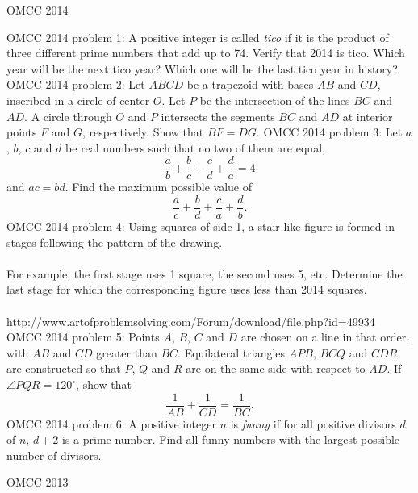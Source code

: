 OMCC 2014 

OMCC 2014 problem 1:  A positive integer is called \textit{tico} if it is the product of three different prime numbers that add up to 74. Verify that 2014 is tico. Which year will be the next tico year? Which one will be the last tico year in history? 
OMCC 2014 problem 2:  Let $ABCD$ be a trapezoid with bases $AB$ and $CD$, inscribed in a circle of center $O$. Let $P$ be the intersection of the lines $BC$ and $AD$. A circle through $O$ and $P$ intersects the segments $BC$ and $AD$ at interior points $F$ and $G$, respectively. Show that $BF=DG$. 
OMCC 2014 problem 3:  Let $a$, $b$, $c$ and $d$ be real numbers such that no two of them are equal,
\[ \frac{a}{b}+\frac{b}{c}+\frac{c}{d}+\frac{d}{a}=4 \]
and $ac=bd$. Find the maximum possible value of
\[ \frac{a}{c}+\frac{b}{d}+\frac{c}{a}+\frac{d}{b}. \] 
OMCC 2014 problem 4:  Using squares of side 1, a stair-like figure is formed in stages following the pattern of the drawing. \\\\
For example, the first stage uses 1 square, the second uses 5, etc. Determine the last stage for which the corresponding figure uses less than 2014 squares. \\\\
http://www.artofproblemsolving.com/Forum/download/file.php?id=49934 
OMCC 2014 problem 5:  Points $A$, $B$, $C$ and $D$ are chosen on a line in that order, with $AB$ and $CD$ greater than $BC$. Equilateral triangles $APB$, $BCQ$ and $CDR$ are constructed so that $P$, $Q$ and $R$ are on the same side with respect to $AD$. If $\angle PQR=120^\circ$, show that
\[ \frac{1}{AB}+\frac{1}{CD}=\frac{1}{BC}. \] 
OMCC 2014 problem 6:  A positive integer $n$ is \textit{funny} if for all positive divisors $d$ of $n$, $d+2$ is a prime number. Find all funny numbers with the largest possible number of divisors. 

OMCC 2013 

